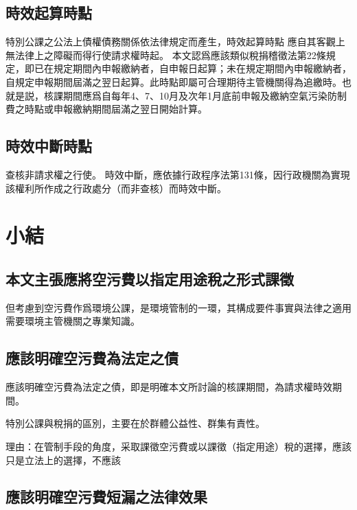 \documentclass[11pt,a4paper]{article}
\begin{document}
\subsection{時效起算時點}
  

特別公課之公法上債權債務關係依法律規定而產生，時效起算時點
應自其客觀上無法律上之障礙而得行使請求權時起。
本文認爲應該類似稅捐稽徵法第22條規定，即已在規定期間內申報繳納者，自申報日起算；未在規定期間內申報繳納者，自規定申報期間屆滿之翌日起算。此時點即屬可合理期待主管機關得為追繳時。也就是説，核課期間應爲自每年4、7、10月及次年1月底前申報及繳納空氣污染防制費之時點或申報繳納期間屆滿之翌日開始計算。

\subsection{時效中斷時點}
查核非請求權之行使。
時效中斷，應依據行政程序法第131條，因行政機關為實現該權利所作成之行政處分（而非查核）而時效中斷。


\section{小結}

\subsection{本文主張應將空污費以指定用途稅之形式課徵}

但考慮到空污費作爲環境公課，是環境管制的一環，其構成要件事實與法律之適用需要環境主管機關之專業知識。

\subsection{應該明確空污費為法定之債}
應該明確空污費為法定之債，即是明確本文所討論的核課期間，為請求權時效期間。




特別公課與稅捐的區別，主要在於群體公益性、群集有責性。

理由：在管制手段的角度，采取課徵空污費或以課徵（指定用途）稅的選擇，應該只是立法上的選擇，不應該

\subsection{應該明確空污費短漏之法律效果}
\end{document}
